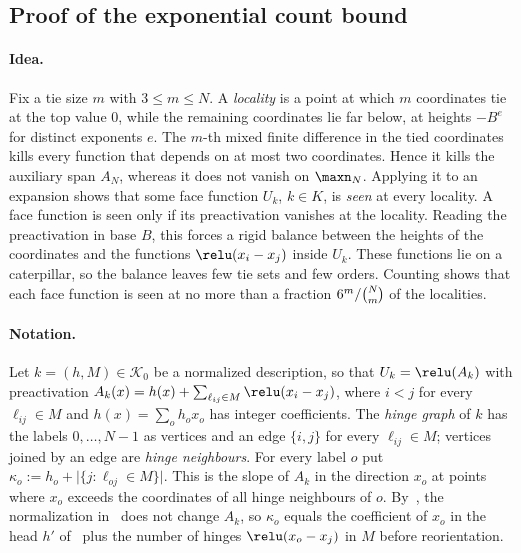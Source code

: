 \subsection{Proof of the exponential count bound}\label{app:count-exponential}

\paragraph{Idea.}
Fix a tie size $m$ with $3\leq m\leq N$. A \emph{locality} is a point at which
$m$ coordinates tie at the top value $0$, while the remaining coordinates lie
far below, at heights $-B^{e}$ for distinct exponents $e$. The $m$-th mixed
finite difference in the tied coordinates kills every function that depends
on at most two coordinates. Hence it kills the auxiliary span $A_N$, whereas
it does not vanish on $\maxn_N$. Applying it to an expansion shows that some
face function $U_k$, $k\in K$, is \emph{seen} at every locality. A face
function is seen only if its preactivation vanishes at the locality. Reading
the preactivation in base $B$, this forces a rigid balance between the
heights of the coordinates and the functions $\relu(x_i-x_j)$ inside $U_k$.
These functions lie on a caterpillar, so the balance leaves few tie sets and
few orders. Counting shows that each face function is seen at no more than
a fraction $6^m/\tbinom Nm$ of the localities.

\paragraph{Notation.}
Let $k=(h,M)\in\mathcal K_0$ be a normalized description, so that
$U_k=\relu(A_k)$ with preactivation
$A_k(x)=h(x)+\sum_{\ell_{ij}\in M}\relu(x_i-x_j)$, where $i<j$ for every
$\ell_{ij}\in M$ and $h(x)=\sum_oh_ox_o$ has integer coefficients. The
\emph{hinge graph} of $k$ has the labels $0,\ldots,N-1$ as vertices and an
edge $\{i,j\}$ for every $\ell_{ij}\in M$; vertices joined by an edge are
\emph{hinge neighbours}. For every label $o$ put
$\kappa_o:=h_o+\bigl|\{j:\ell_{oj}\in M\}\bigr|$. This is the slope of $A_k$
in the direction $x_o$ at points where $x_o$ exceeds the coordinates of all
hinge neighbours of $o$. By~, the normalization
in~ does not change $A_k$, so $\kappa_o$ equals
the coefficient of $x_o$ in the head $h'$ of~ plus
the number of hinges $\relu(x_o-x_j)$ in $M$ before reorientation.

